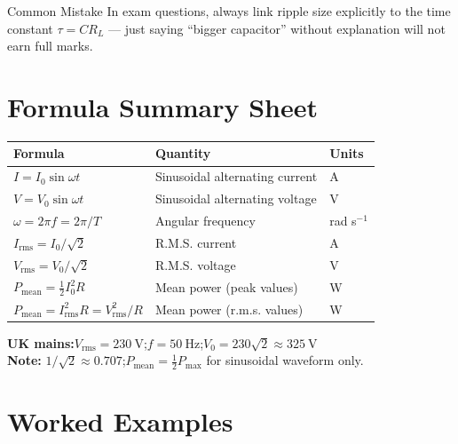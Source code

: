 \begin{warningbox}{Common Mistake}
In exam questions, always link ripple size explicitly to the time constant $\tau = CR_L$ — just saying ``bigger capacitor'' without explanation will not earn full marks.
\end{warningbox}

\section{Formula Summary Sheet}

\begin{minipage}{\linewidth}
\begin{tcolorbox}[colback=lightgold, colframe=accentgold]
\renewcommand{\arraystretch}{1.8}
\begin{tabular}{@{}lll@{}}
\toprule
\textbf{Formula} & \textbf{Quantity} & \textbf{Units} \\
\midrule
$I = I_0\sin\omega t$ & Sinusoidal alternating current & A \\
$V = V_0\sin\omega t$ & Sinusoidal alternating voltage & V \\
$\omega = 2\pi f = 2\pi/T$ & Angular frequency & rad s$^{-1}$ \\
$I_{\text{rms}} = I_0/\sqrt{2}$ & R.M.S. current & A \\
$V_{\text{rms}} = V_0/\sqrt{2}$ & R.M.S. voltage & V \\
$P_{\text{mean}} = \tfrac{1}{2}I_0^2 R$ & Mean power (peak values) & W \\
$P_{\text{mean}} = I_{\text{rms}}^2 R = V_{\text{rms}}^2/R$ & Mean power (r.m.s. values) & W \\
\bottomrule
\end{tabular}
\end{tcolorbox}

\vspace{0.5em}
\begin{tcolorbox}[colback=lightblue, colframe=darkblue]
\textbf{UK mains:}\quad $V_{\text{rms}} = 230\ \text{V}$;\quad $f = 50\ \text{Hz}$;\quad $V_0 = 230\sqrt{2} \approx 325\ \text{V}$\\[0.3em]
\textbf{Note:} $1/\sqrt{2} \approx 0.707$;\quad $P_{\text{mean}} = \tfrac{1}{2}P_{\text{max}}$ for sinusoidal waveform only.
\end{tcolorbox}
\end{minipage}

\section{Worked Examples}

